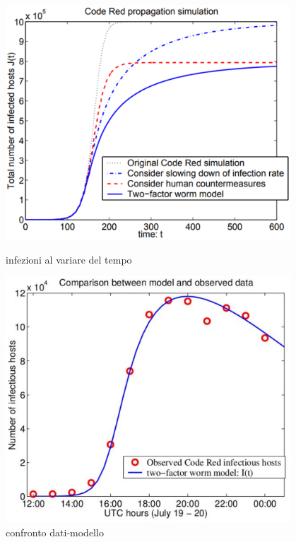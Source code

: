 \begin{figure}
    \centering
    \begin{minipage}{0.5\textwidth}
        \centering
        \includegraphics[width=0.95\textwidth]{images/tf_model} %
        \caption{infezioni al variare del tempo}
        \label{tf_model}
    \end{minipage}\hfill
    \begin{minipage}{0.5\textwidth}
        \centering
        \includegraphics[width=0.95\textwidth]{images/tf_compare} %
        \caption{confronto dati-modello}
        \label{tf_compare}
    \end{minipage}
\end{figure}
